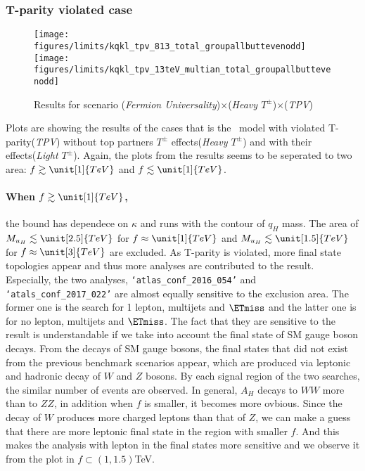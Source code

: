 
\subsubsection{T-parity violated case}
\begin{figure*}[h]
\centering
\texttt{[image: figures/limits/kqkl\_tpv\_813\_total\_groupallbuttevenodd]} 
\texttt{[image: figures/limits/kqkl\_tpv\_13teV\_multian\_total\_groupallbuttevenodd]}
\caption{Results for scenario (\emph{Fermion Universality})$\times$(\emph{Heavy $T^\pm$})$\times$(\emph{TPV})}
\label{fig:cmresults:univtpvnotop}
\end{figure*}


Plots  are showing the results of the cases that is the \fu~model with violated T-parity(\emph{TPV}) 
without top partners $T^\pm$ effects(\emph{Heavy $T^\pm$}) and with their effects(\emph{Light $T^\pm$}).  
Again, the plots from the results seems to be seperated to two area: $f \gtrsim \unit[1]{TeV}$ and $f \lesssim \unit[1]{TeV}$.

\paragraph{When $f \gtrsim \unit[1]{TeV}$,} the bound has dependece on $\kappa$ and runs with the contour of $q_H$ mass.
The area of $M_{u_H} \lesssim \unit[2.5]{TeV}$ for $f \approx \unit[1]{TeV}$ and 
$M_{u_H} \lesssim \unit[1.5]{TeV}$ for $f \approx \unit[3]{TeV}$ are excluded.
As T-parity is violated, more final state topologies appear and thus more analyses are contributed to the result.
Especially, the two analyses, \texttt{`atlas\_conf\_2016\_054'} and \texttt{`atals\_conf\_2017\_022'} are almost equally sensitive to the exclusion area.
The former one is the search for 1 lepton, multijets and $\ETmiss$ and the latter one is for no lepton, multijets and $\ETmiss$.
The fact that they are sensitive to the result is understandable if we take into account the final state of SM gauge boson decays. 
From the decays of SM gauge bosons, the final states that did not exist from the previous benchmark scenarios appear,
which are produced via leptonic and hadronic decay of $W$ and $Z$ bosons. 
By each signal region of the two searches, the similar number of events are observed. 
In general, $A_H$ decays to $WW$ more than to $ZZ$, in addition when $f$ is smaller, it becomes more ovbious. 
Since the decay of $W$ produces more charged leptons than that of $Z$, we can make a guess that there are more leptonic final state in the region with smaller $f$. 
And this makes the analysis with lepton in the final states more sensitive and 
we observe it from the plot  in $f \subset (1,1.5)$TeV. 


